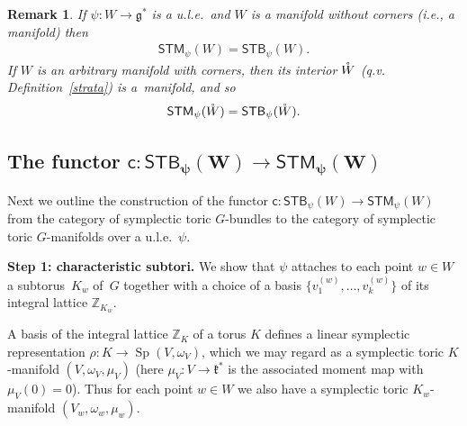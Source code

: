 \documentclass[pdftex]{sigma}
\numberwithin{equation}{section}
\newtheorem{Remark}[Lemma]{Remark}
\begin{document}
\begin{Remark}\label{interior}
  If $\psi \colon W\to {\mathfrak g}^*$ is a u.l.e.\ and $W$
is a manifold without corners (i.e., a manifold) then
\begin{gather*}
{\textsf{STM}}_\psi(W) = {\textsf{STB}}_\psi (W).
\end{gather*}
If $W$ is an arbitrary manifold with corners, then its interior ${\mathaccent23{W}}$
(q.v. Def\/inition~\ref{strata}) is a~manifold, and so
\begin{gather*}
{\textsf{STM}}_\psi({\mathaccent23{W}}) = {\textsf{STB}}_\psi ({\mathaccent23{W}}).
\end{gather*}
\end{Remark}


\subsection*{The functor $\boldsymbol{{\textsf{c}} \colon{\textsf{STB}}_{\psi}(W)  \to   {\textsf{STM}}_{\psi}(W)}$}

Next we outline the construction of the functor ${\textsf{c}} \colon
  {\textsf{STB}}_{\psi}(W)   \to   {\textsf{STM}}_{\psi}(W) $ from the category of
symplectic toric $G$-bundles to the category of symplectic toric
$G$-manifolds over a u.l.e.~$\psi$.

{\bf Step 1: characteristic subtori.} We show that $\psi$
attaches to each point $w\in W$ a subto\-rus~$K_w$ of~$G$ together with
a choice of a basis
$\{v_1^{(w)},\ldots, v_k^{(w)}\}$ of its integral lattice ${\mathbb Z}_{K_w}$.

A basis of the integral lattice ${\mathbb Z}_K$ of a torus $K$
def\/ines a linear symplectic representation
$\rho\colon K\to \operatorname{Sp}(V,\omega_V)$, which we may regard as a symplectic toric
$K$-manifold $(V,\omega_V, \mu_V)$ (here $\mu_V\colon V\to{\mathfrak k}^*$ is the
associated moment map with $\mu_V(0)=0$).  Thus for each point
$w\in W$ we also have a symplectic toric $K_w$-manifold $(V_w,
\omega_w, \mu_w)$.
\end{document}
